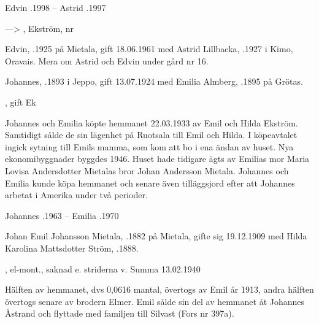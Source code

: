 Edvin .1998  --  Astrid .1997


--->	, Ekström,  nr 

Edvin, .1925 på Mietala, gift  18.06.1961 med Astrid Lillbacka, .1927 i Kimo, Oravais. Mera om Astrid och Edvin under gård nr 16.


Johannes, .1893 i Jeppo,  gift 13.07.1924 med Emilia Almberg, .1895 på Grötas.
\begin{jhchildren}
  \item {}
  \item {}, gift Ek
\end{jhchildren}
Johannes och Emilia köpte hemmanet 22.03.1933 av Emil och Hilda Ekström. Samtidigt sålde de sin lägenhet på  Ruotsala till Emil och Hilda. I köpeavtalet ingick sytning till Emils mamma, som kom att bo i ena ändan av huset. Nya ekonomibyggnader byggdes 1946. Huset hade tidigare ägts av Emilias mor Maria Lovisa Andersdotter Mietalas bror Johan Andersson Mietala. Johannes och Emilia kunde köpa hemmanet och senare även tilläggsjord efter att Johannes arbetat i Amerika under två perioder.

Johannes .1963  --  Emilia .1970


Johan Emil Johansson Mietala, .1882 på Mietala, gifte sig 19.12.1909  med Hilda Karolina Mattsdotter Ström, .1888.
\begin{jhchildren}
  \item {}
  \item {}, el-mont., saknad e. striderna v. Summa 13.02.1940
  \item {}
  \item {}
  \item {}
  \item {}
  \item {}
  \item {}
  \item {}
  \item {}
\end{jhchildren}
Hälften av hemmanet, dvs 0,0616 mantal, övertogs av Emil år 1913, andra hälften övertogs senare av brodern Elmer. Emil sålde sin del av hemmanet åt Johannes Åstrand och flyttade med familjen till Silvast (Fors nr 397a).


